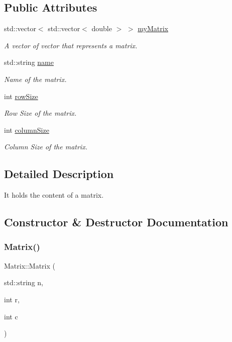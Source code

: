 \subsection*{Public Attributes}
\begin{DoxyCompactItemize}
\item 
std\+::vector$<$ std\+::vector$<$ double $>$ $>$ \hyperlink{class_matrix_afdea8580ef7ee0072e0100c72c18e218}{my\+Matrix}
\begin{DoxyCompactList}\small\item\em A vector of vector that represents a matrix. \end{DoxyCompactList}\item 
std\+::string \hyperlink{class_matrix_ab15f3c0e2ef820cc3aa6d58475b15443}{name}
\begin{DoxyCompactList}\small\item\em Name of the matrix. \end{DoxyCompactList}\item 
int \hyperlink{class_matrix_aa5b31a8cec6508cf23b72394ff8aabe7}{row\+Size}
\begin{DoxyCompactList}\small\item\em Row Size of the matrix. \end{DoxyCompactList}\item 
int \hyperlink{class_matrix_aab666250ce075e35e1d7d0d8097cc884}{column\+Size}
\begin{DoxyCompactList}\small\item\em Column Size of the matrix. \end{DoxyCompactList}\end{DoxyCompactItemize}


\subsection{Detailed Description}
It holds the content of a matrix. 

\subsection{Constructor \& Destructor Documentation}
\mbox{\label{class_matrix_aad0f8fc2b1b0540e965d762e154452d9}} 
\subsubsection{\texorpdfstring{Matrix()}{Matrix()}\hspace{0.1cm}{\footnotesize\ttfamily [1/2]}}
{\footnotesize\ttfamily Matrix\+::\+Matrix (\begin{DoxyParamCaption}\item[{std\+::string}]{n,  }\item[{int}]{r,  }\item[{int}]{c }\end{DoxyParamCaption})}

